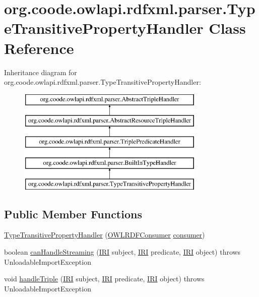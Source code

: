 \hypertarget{classorg_1_1coode_1_1owlapi_1_1rdfxml_1_1parser_1_1_type_transitive_property_handler}{\section{org.\-coode.\-owlapi.\-rdfxml.\-parser.\-Type\-Transitive\-Property\-Handler Class Reference}
\label{classorg_1_1coode_1_1owlapi_1_1rdfxml_1_1parser_1_1_type_transitive_property_handler}
}
Inheritance diagram for org.\-coode.\-owlapi.\-rdfxml.\-parser.\-Type\-Transitive\-Property\-Handler\-:\begin{figure}[H]
\begin{center}
\leavevmode
\includegraphics[height=5.000000cm]{classorg_1_1coode_1_1owlapi_1_1rdfxml_1_1parser_1_1_type_transitive_property_handler}
\end{center}
\end{figure}
\subsection*{Public Member Functions}
\begin{DoxyCompactItemize}
\item 
\hyperlink{classorg_1_1coode_1_1owlapi_1_1rdfxml_1_1parser_1_1_type_transitive_property_handler_a4ac40a865dfab3affd2f4bd3f873ab50}{Type\-Transitive\-Property\-Handler} (\hyperlink{classorg_1_1coode_1_1owlapi_1_1rdfxml_1_1parser_1_1_o_w_l_r_d_f_consumer}{O\-W\-L\-R\-D\-F\-Consumer} \hyperlink{classorg_1_1coode_1_1owlapi_1_1rdfxml_1_1parser_1_1_abstract_triple_handler_a4ccf4d898ff01eb1cadfa04b23d54e9c}{consumer})
\item 
boolean \hyperlink{classorg_1_1coode_1_1owlapi_1_1rdfxml_1_1parser_1_1_type_transitive_property_handler_aa7cf4b96c91db4c8d3fb47052c6b687c}{can\-Handle\-Streaming} (\hyperlink{classorg_1_1semanticweb_1_1owlapi_1_1model_1_1_i_r_i}{I\-R\-I} subject, \hyperlink{classorg_1_1semanticweb_1_1owlapi_1_1model_1_1_i_r_i}{I\-R\-I} predicate, \hyperlink{classorg_1_1semanticweb_1_1owlapi_1_1model_1_1_i_r_i}{I\-R\-I} object)  throws Unloadable\-Import\-Exception 
\item 
void \hyperlink{classorg_1_1coode_1_1owlapi_1_1rdfxml_1_1parser_1_1_type_transitive_property_handler_aae32c7d68dc8ad2b7b2bd0605f2dac36}{handle\-Triple} (\hyperlink{classorg_1_1semanticweb_1_1owlapi_1_1model_1_1_i_r_i}{I\-R\-I} subject, \hyperlink{classorg_1_1semanticweb_1_1owlapi_1_1model_1_1_i_r_i}{I\-R\-I} predicate, \hyperlink{classorg_1_1semanticweb_1_1owlapi_1_1model_1_1_i_r_i}{I\-R\-I} object)  throws Unloadable\-Import\-Exception 
\end{DoxyCompactItemize}
